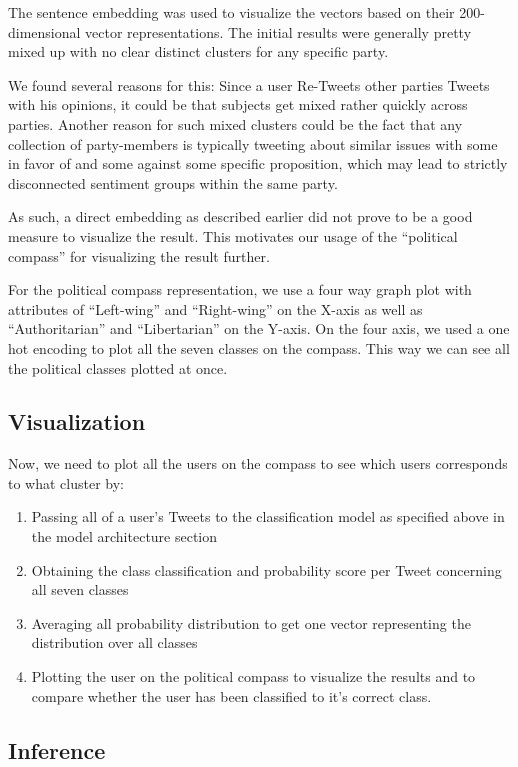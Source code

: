 \documentclass[10pt, oneside]{article}
\begin{document}
\begin{multicols}{2}
The sentence embedding was used to visualize the vectors based on their 200-dimensional vector representations. The initial results were generally pretty mixed up with no clear distinct clusters for any specific party.

We found several reasons for this:
Since a user Re-Tweets other parties Tweets with his opinions, it could be that subjects get mixed rather quickly across parties.
Another reason for such mixed clusters could be the fact that any collection of party-members is typically tweeting about similar issues with some in favor of and some against some specific proposition, which may lead to strictly disconnected sentiment groups within the same party.

As such, a direct embedding as described earlier did not prove to be a good measure to visualize the result. This motivates our usage of the ``political compass'' \cite{PoliticalCompass} for visualizing the result further. 

For the political compass representation, we use a four way graph plot with attributes of ``Left-wing'' and ``Right-wing'' on the X-axis as well as  ``Authoritarian'' and ``Libertarian'' on the Y-axis. On the four axis, we used a one hot encoding to plot all the seven classes on the compass. This way we can see all the political classes plotted at once.

\subsection{Visualization}

Now, we need to plot all the users on the compass to see which users corresponds to what cluster by:
\begin{enumerate}
	\item Passing all of a user's Tweets to the classification model as specified above in the model architecture section
	\item Obtaining the class classification and probability score per Tweet concerning all seven classes
	\item Averaging all probability distribution to get one vector representing the distribution over all classes
	\item Plotting the user on the political compass to visualize the results and to compare whether the user has been classified to it’s correct class.
\end{enumerate}

\subsection{Inference}


\end{multicols}
\end{document}
